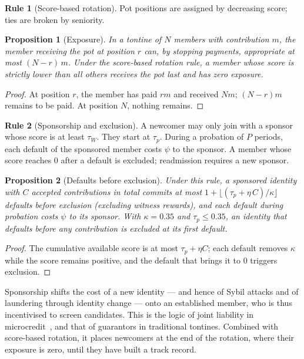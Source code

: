 \documentclass[11pt,a4paper]{article}
\theoremstyle{plain}
\newtheorem{proposition}{Proposition}
\theoremstyle{definition}
\newtheorem{rulee}{Rule}
\theoremstyle{remark}
\newcommand{\1}{\mathbf{1}}
\begin{document}
\begin{rulee}[Score-based rotation]
Pot positions are assigned by decreasing score; ties are broken by seniority.
\end{rulee}

\begin{proposition}[Exposure]\label{prop:rotation}
In a tontine of $N$ members with contribution $m$, the member receiving the pot
at position $r$ can, by stopping payments, appropriate at most $(N-r)\,m$.
Under the score-based rotation rule, a member whose score is strictly lower than
all others receives the pot last and has zero exposure.
\end{proposition}
\begin{proof}
At position $r$, the member has paid $rm$ and received $Nm$; $(N-r)m$ remains
to be paid. At position $N$, nothing remains.
\end{proof}

\begin{rulee}[Sponsorship and exclusion]
A newcomer may only join with a sponsor whose score is at least $\tau_W$. They
start at $\tau_p$. During a probation of $P$ periods, each default of the
sponsored member costs $\psi$ to the sponsor. A member whose score reaches 0
after a default is excluded; readmission requires a new sponsor.
\end{rulee}

\begin{proposition}[Defaults before exclusion]\label{prop:sponsor}
Under this rule, a sponsored identity with $C$ accepted contributions in total
commits at most $1+\lfloor(\tau_p+\eta\,C)/\kappa\rfloor$ defaults before
exclusion (excluding witness rewards), and each default during probation costs
$\psi$ to its sponsor. With $\kappa=0.35$ and $\tau_p\le0.35$, an identity that
defaults before any contribution is excluded at its first default.
\end{proposition}
\begin{proof}
The cumulative available score is at most $\tau_p+\eta C$; each default removes
$\kappa$ while the score remains positive, and the default that brings it to 0
triggers exclusion.
\end{proof}

Sponsorship shifts the cost of a new identity --- and hence of Sybil attacks and
of laundering through identity change --- onto an established member, who is
thus incentivised to screen candidates. This is the logic of joint liability in
microcredit~\cite{besley1995,ghatak1999}, and that of guarantors in traditional
tontines. Combined with score-based rotation, it places newcomers at the end of
the rotation, where their exposure is zero, until they have built a track
record.
\end{document}

